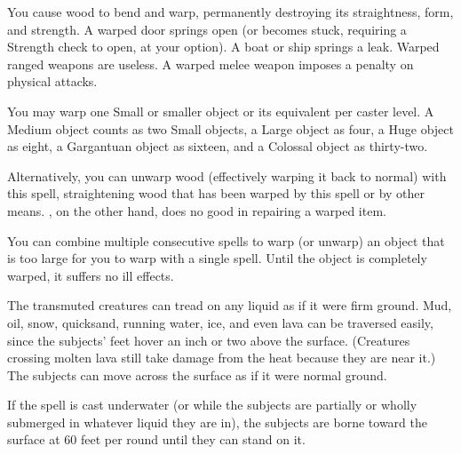 \spellrng{\rngclose}
\begin{spelleffect}
  You cause wood to bend and warp, permanently destroying its straightness, form, and strength. A warped door springs open (or becomes stuck, requiring a Strength check to open, at your option). A boat or ship springs a leak. Warped ranged weapons are useless. A warped melee weapon imposes a  penalty on physical attacks.
  \par You may warp one Small or smaller object or its equivalent per caster level. A Medium object counts as two Small objects, a Large object as four, a Huge object as eight, a Gargantuan object as sixteen, and a Colossal object as thirty-two.
  \par Alternatively, you can unwarp wood (effectively warping it back to normal) with this spell, straightening wood that has been warped by this spell or by other means. , on the other hand, does no good in repairing a warped item.
\end{spelleffect}
\begin{spellnotes}
  You can combine multiple consecutive  spells to warp (or unwarp) an object that is too large for you to warp with a single spell. Until the object is completely warped, it suffers no ill effects.
\end{spellnotes}

\begin{spelleffect}
  The transmuted creatures can tread on any liquid as if it were firm ground. Mud, oil, snow, quicksand, running water, ice, and even lava can be traversed easily, since the subjects' feet hover an inch or two above the surface. (Creatures crossing molten lava still take damage from the heat because they are near it.) The subjects can move across the surface as if it were normal ground.
  \par If the spell is cast underwater (or while the subjects are partially or wholly submerged in whatever liquid they are in), the subjects are borne toward the surface at 60 feet per round until they can stand on it.
\end{spelleffect}

